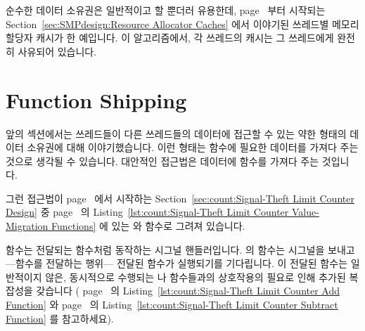 순수한 데이터 소유권은 일반적이고 할 뿐더러 유용한데,
page~\pageref{sec:SMPdesign:Resource Allocator Caches} 부터 시작되는
Section~\ref{sec:SMPdesign:Resource Allocator Caches} 에서 이야기된
쓰레드별 메모리 할당자 캐시가 한 예입니다.
이 알고리즘에서, 각 쓰레드의 캐시는 그 쓰레드에게 완전히 사유되어 있습니다.
\iffalse

Pure data ownership is also both common and useful, for example, the
per-thread memory-allocator caches discussed in
Section~\ref{sec:SMPdesign:Resource Allocator Caches}
starting on
page~\pageref{sec:SMPdesign:Resource Allocator Caches}.
In this algorithm, each thread's cache is completely private to that
thread.
\fi

\section{Function Shipping}
\label{sec:owned:Function Shipping}

앞의 섹션에서는 쓰레드들이 다른 쓰레드들의 데이터에 접근할 수 있는 약한 형태의
데이터 소유권에 대해 이야기했습니다.
이런 형태는 함수에 필요한 데이터를 가져다 주는 것으로 생각될 수 있습니다.
대안적인 접근법은 데이터에 함수를 가져다 주는 것입니다.

그런 접근법이
page~\pageref{sec:count:Signal-Theft Limit Counter Design} 에서 시작하는
Section~\ref{sec:count:Signal-Theft Limit Counter Design} 중
page~\pageref{lst:count:Signal-Theft Limit Counter Value-Migration Functions}
의
Listing~\ref{lst:count:Signal-Theft Limit Counter Value-Migration Functions}
에 있는  와  함수로 그려져
있습니다.

\iffalse
The previous section described a weak form of data ownership where
threads reached out to other threads' data.
This can be thought of as bringing the data to the functions that
need it.
An alternative approach is to send the functions to the data.

Such an approach is illustrated in
Section~\ref{sec:count:Signal-Theft Limit Counter Design}
beginning on
page~\pageref{sec:count:Signal-Theft Limit Counter Design},
in particular the \co{flush_local_count_sig()} and
\co{flush_local_count()} functions in
Listing~\ref{lst:count:Signal-Theft Limit Counter Value-Migration Functions}
on
page~\pageref{lst:count:Signal-Theft Limit Counter Value-Migration Functions}.
\fi

 함수는 전달되는 함수처럼 동작하는 시그널
핸들러입니다.
 의  함수는 시그널을 보내고---함수를
전달하는 행위--- 전달된 함수가 실행되기를 기다립니다.
이 전달된 함수는 일반적이지 않은, 동시적으로 수행되는  나
 함수들과의 상호작용의 필요로 인해 추가된 복잡성을 갖습니다 (
page~\pageref{lst:count:Signal-Theft Limit Counter Add Function} 의
Listing~\ref{lst:count:Signal-Theft Limit Counter Add Function} 와
page~\pageref{lst:count:Signal-Theft Limit Counter Subtract Function} 의
Listing~\ref{lst:count:Signal-Theft Limit Counter Subtract Function} 를
참고하세요).
\iffalse

